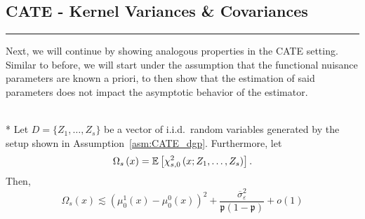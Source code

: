 \subsection{CATE - Kernel Variances \& Covariances}\label{sec:CATE_cov}
\hrule
Next, we will continue by showing analogous properties in the CATE setting.
Similar to before, we will start under the assumption that the functional nuisance parameters are known a priori, to then show that the estimation of said parameters does not impact the asymptotic behavior of the estimator.

\begin{boxD}
    \begin{lem}\label{lem:CATE_omega_s}\mbox{}\\*
	Let $D = \{Z_1, \dotsc, Z_{s}\}$ be a vector of i.i.d.\ random variables generated by the setup shown in Assumption~\ref{asm:CATE_dgp}.
	Furthermore, let
	\begin{equation}
		\Omega_{s}\left(x\right)
		= \mathbb{E}\left[\chi_{s,0}^{2}\left(x; Z_1, \ldots,  Z_{s}\right)\right].
	\end{equation}
	Then,
	\begin{equation}
		\Omega_{s}\left(x\right)
		\lesssim \left(\mu_{0}^{1}\left(x\right) - \mu_{0}^{0}\left(x\right)\right)^2 + \frac{\overline{\sigma}^2_{\varepsilon}}{\mathfrak{p}\left(1 - \mathfrak{p}\right)} + o(1)
	\end{equation}
\end{lem}
\end{boxD}

